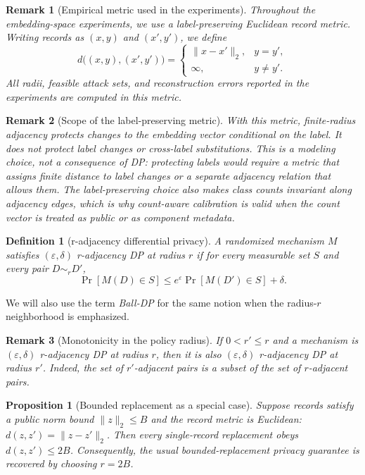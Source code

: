 \documentclass[conference,compsoc]{IEEEtran}
\newtheorem{definition}{Definition}
\newtheorem{proposition}{Proposition}
\newtheorem{remark}{Remark}
\begin{document}
\begin{remark}[Empirical metric used in the experiments]
\label{rem:label-preserving-metric}
Throughout the embedding-space experiments, we use a label-preserving Euclidean record metric. Writing records as $(x,y)$ and $(x',y')$, we define
\[
d\big((x,y),(x',y')\big)=
\begin{cases}
\|x-x'\|_2, & y=y',\\
\infty, & y\neq y'.
\end{cases}
\]
All radii, feasible attack sets, and reconstruction errors reported in the experiments are computed in this metric.
\end{remark}
\begin{remark}[Scope of the label-preserving metric]
With this metric, finite-radius adjacency protects changes to the embedding vector conditional on the label. It does not protect label changes or cross-label substitutions. This is a modeling choice, not a consequence of DP: protecting labels would require a metric that assigns finite distance to label changes or a separate adjacency relation that allows them. The label-preserving choice also makes class counts invariant along adjacency edges, which is why count-aware calibration is valid when the count vector is treated as public or as component metadata.
\end{remark}

\begin{definition}[r-adjacency differential privacy]
A randomized mechanism $M$ satisfies \emph{$(\varepsilon,\delta)$ r-adjacency DP at radius $r$} if for every measurable set $S$ and every pair $D\sim_r D'$,
\[
\Pr[M(D)\in S]\le e^{\varepsilon}\Pr[M(D')\in S]+\delta.
\]
\end{definition}

We will also use the term \emph{Ball-DP} for the same notion when the radius-$r$ neighborhood is emphasized.

\begin{remark}[Monotonicity in the policy radius]
If $0<r'\le r$ and a mechanism is $(\varepsilon,\delta)$ r-adjacency DP at radius $r$, then it is also $(\varepsilon,\delta)$ r-adjacency DP at radius $r'$. Indeed, the set of $r'$-adjacent pairs is a subset of the set of $r$-adjacent pairs.
\end{remark}

\begin{proposition}[Bounded replacement as a special case]
Suppose records satisfy a public norm bound $\|z\|_2\le B$ and the record metric is Euclidean: $d(z,z')=\|z-z'\|_2$. Then every single-record replacement obeys $d(z,z')\le 2B$. Consequently, the usual bounded-replacement privacy guarantee is recovered by choosing $r=2B$.
\end{proposition}
\end{document}
